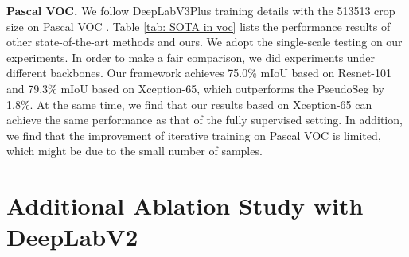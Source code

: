 \documentclass[10pt,twocolumn,letterpaper]{article}
\def\SOTA{state-of-the-art\xspace}
\begin{document}
{\noindent\textbf{Pascal VOC.}
We follow DeepLabV3Plus \cite{chen2018encoder} training details with the 513513 crop size on Pascal VOC \cite{everingham2012pascal}. Table \ref{tab: SOTA in voc} lists the performance results of other state-of-the-art methods and ours. We adopt the single-scale testing on our experiments. In order to make a fair comparison, we did experiments under different backbones. Our framework achieves 75.0\% mIoU based on Resnet-101\cite{He2016Deep} and 79.3\% mIoU based on Xception-65\cite{chen2018encoder}, which outperforms the PseudoSeg \cite{zou2020pseudoseg} by 1.8\%. At the same time, we find that our results based on Xception-65 can achieve the same performance 
as that of the fully supervised setting.
In addition, we find that the improvement of iterative training on Pascal VOC is limited, which might be due to the small number of samples.





\begin{table}
\begin{center}
\end{center}
\caption{Comparison with  \SOTA on the Pascal VOC val set (w/ unlabeled data). We use the official training set (1.4k) as labeled data, and the augmented set (9k) as unlabeled data. 
}
\label{tab: SOTA in voc}
\vspace{-1em}
\end{table}
 




\section{Additional Ablation Study with DeepLabV2}

}
\end{document}
